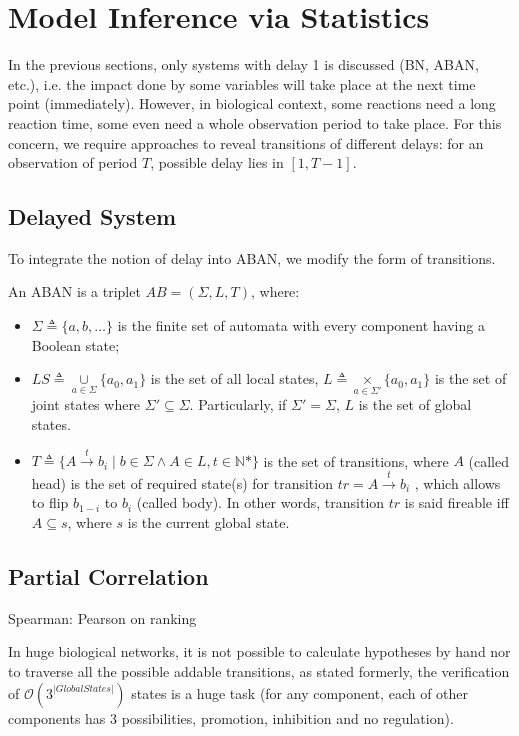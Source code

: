  

\section{Model Inference via Statistics}
In the previous sections, only systems with delay 1 is discussed (BN, ABAN, etc.), i.e. the impact done by some variables will take place at the next time point (immediately).
However, in biological context, some reactions need a long reaction time, some even need a whole observation period to take place.
For this concern, we require approaches to reveal transitions of different delays: for an observation of period $T$, possible delay lies in $[1,T-1]$.

\subsection{Delayed System}
To integrate the notion of delay into ABAN, we modify the form of transitions.
\begin{definition}
An ABAN is a triplet $AB = (\Sigma,L,T)$, where:
\begin{itemize}
\item $\Sigma\triangleq\{a,b,\ldots\}$ is the finite set of automata with every component having a Boolean state;
\item $LS\triangleq \underset{a\in \Sigma}{\cup} \{a_0,a_1\}$ is the set of all local states, $L\triangleq \underset{a\in \Sigma'}{\times} \{a_0,a_1\}$ is the set of joint states where $\Sigma'\subseteq\Sigma$. Particularly, if $\Sigma'=\Sigma$, $L$ is the set of global states. 
\item $T\triangleq \{A\xrightarrow{t} b_i\mid b\in \Sigma \land A\in L, t\in \mathbb{N}*\}$ is the set of transitions, where $A$ (called head) is the set of required state(s) for transition $tr=A\xrightarrow{t} b_i$ , which allows to flip $b_{1-i}$ to $b_i$ (called body). In other words, transition $tr$ is said fireable iff $A\subseteq s$, where $s$ is the current global state.
\end{itemize}
\end{definition}

\subsection{Partial Correlation}
Spearman: Pearson on ranking

In huge biological networks, it is not possible to calculate hypotheses by hand nor to traverse all the possible addable transitions, as stated formerly, the verification of $\mathcal{O}(3^{|Global States|})$ states is a huge task (for any component, each of other components has 3 possibilities, promotion, inhibition and no regulation).
 
